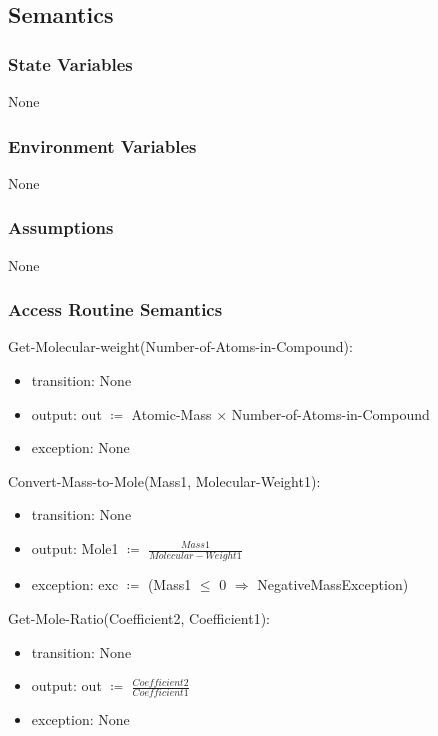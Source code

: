 \documentclass[12pt, titlepage]{article}
\begin{document}
\subsection{Semantics}

\subsubsection{State Variables}

None


\subsubsection{Environment Variables}

None

\subsubsection{Assumptions}

None

\subsubsection{Access Routine Semantics}

\noindent Get-Molecular-weight(Number-of-Atoms-in-Compound):
\begin{itemize}
\item transition: None
\item output: out $\coloneqq$  Atomic-Mass $\times$ Number-of-Atoms-in-Compound
\item exception: None 
\end{itemize}

\noindent Convert-Mass-to-Mole(Mass1, Molecular-Weight1):
\begin{itemize}
\item transition: None
\item output: Mole1 $\coloneqq$  $\frac{Mass1}{Molecular-Weight1}$
\item exception: exc $\coloneqq$ (Mass1 $\leq$ 0 $\Rightarrow$ NegativeMassException) 
\end{itemize}

\noindent Get-Mole-Ratio(Coefficient2, Coefficient1):
\begin{itemize}
\item transition: None
\item output: out $\coloneqq$ $\frac{Coefficient2}{Coefficient1}$
\item exception: None 
\end{itemize}
\end{document}
